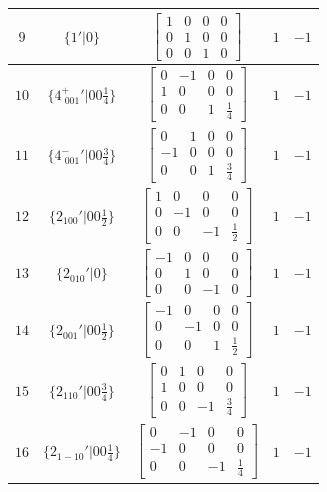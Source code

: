 \documentclass[fleqn,8pt]{jsarticle}
\begin{document}
\begin{longtable}{ccccc}
$ 9 $ & $ \{1{}'|0\} $ & $ \begin{bmatrix} 1 & 0 & 0 & 0 \\ 0 & 1 & 0 & 0 \\ 0 & 0 & 1 & 0 \end{bmatrix} $ & $ 1 $ & $ -1 $ \\ \hline
$ 10 $ & $ \{4^{+}_{\,\,001}{}'|0 0 \frac{1}{4}\} $ & $ \begin{bmatrix} 0 & -1 & 0 & 0 \\ 1 & 0 & 0 & 0 \\ 0 & 0 & 1 & \frac{1}{4} \end{bmatrix} $ & $ 1 $ & $ -1 $ \\ \hline
$ 11 $ & $ \{4^{-}_{\,\,001}{}'|0 0 \frac{3}{4}\} $ & $ \begin{bmatrix} 0 & 1 & 0 & 0 \\ -1 & 0 & 0 & 0 \\ 0 & 0 & 1 & \frac{3}{4} \end{bmatrix} $ & $ 1 $ & $ -1 $ \\ \hline
$ 12 $ & $ \{2{}_{100}{}'|0 0 \frac{1}{2}\} $ & $ \begin{bmatrix} 1 & 0 & 0 & 0 \\ 0 & -1 & 0 & 0 \\ 0 & 0 & -1 & \frac{1}{2} \end{bmatrix} $ & $ 1 $ & $ -1 $ \\ \hline
$ 13 $ & $ \{2{}_{010}{}'|0\} $ & $ \begin{bmatrix} -1 & 0 & 0 & 0 \\ 0 & 1 & 0 & 0 \\ 0 & 0 & -1 & 0 \end{bmatrix} $ & $ 1 $ & $ -1 $ \\ \hline
$ 14 $ & $ \{2{}_{001}{}'|0 0 \frac{1}{2}\} $ & $ \begin{bmatrix} -1 & 0 & 0 & 0 \\ 0 & -1 & 0 & 0 \\ 0 & 0 & 1 & \frac{1}{2} \end{bmatrix} $ & $ 1 $ & $ -1 $ \\ \hline
$ 15 $ & $ \{2{}_{110}{}'|0 0 \frac{3}{4}\} $ & $ \begin{bmatrix} 0 & 1 & 0 & 0 \\ 1 & 0 & 0 & 0 \\ 0 & 0 & -1 & \frac{3}{4} \end{bmatrix} $ & $ 1 $ & $ -1 $ \\ \hline
$ 16 $ & $ \{2{}_{1-10}{}'|0 0 \frac{1}{4}\} $ & $ \begin{bmatrix} 0 & -1 & 0 & 0 \\ -1 & 0 & 0 & 0 \\ 0 & 0 & -1 & \frac{1}{4} \end{bmatrix} $ & $ 1 $ & $ -1 $ \\
\end{longtable}
\end{document}
